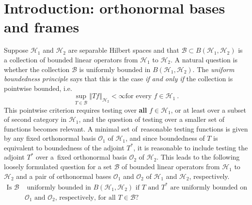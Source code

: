 \documentclass{amsart}%
\theoremstyle{plain}
\numberwithin{equation}{section}
\begin{document}
\section{Introduction: orthonormal bases and frames}

Suppose $\mathcal{H}_{1}$ and $\mathcal{H}_{2}$ are separable Hilbert spaces
and that $\mathcal{B}\subset B\left(  \mathcal{H}_{1},\mathcal{H}_{2}\right)
$ is a collection of bounded linear operators from $\mathcal{H}_{1}$ to
$\mathcal{H}_{2}$. A natural question is whether the
collection $\mathcal{B}$ is uniformly bounded in $B\left(  \mathcal{H}%
_{1},\mathcal{H}_{2}\right)  $. The \emph{uniform boundedness principle} says
that this is the case \emph{if and only if} the collection is pointwise
bounded, i.e.%
\[
\sup_{T\in\mathcal{B}}\left\Vert Tf\right\Vert _{\mathcal{H}_{2}}<\infty\text{
for every }f\in\mathcal{H}_{1}\ .
\]
This pointwise criterion requires testing over \textbf{all} $f\in
\mathcal{H}_{1}$, or at least over a subset of second category in
$\mathcal{H}_{1}$, and the question of testing over a smaller set of
functions becomes relevant. A minimal set of\ reasonable testing functions is
given by any fixed orthonormal basis $\mathcal{O}_{1}$ of $\mathcal{H}_{1}$,
and since boundedness of $T$ is equivalent to boundedness of the adjoint
$T^{\ast}$, it is reasonable to include testing the adjoint $T^{\ast}$ over
a\ fixed orthonormal basis $\mathcal{O}_{2}$ of $\mathcal{H}_{2}$. This leads
to the following loosely formulated question for a set $\mathcal{B}$ of
bounded linear operators from $\mathcal{H}_{1}$ to $\mathcal{H}_{2}$ and a
pair of orthonormal bases $\mathcal{O}_{1}$ and $\mathcal{O}_{2}$ of
$\mathcal{H}_{1}$ and $\mathcal{H}_{2}$, respectively.
\begin{align}
  \text{Is }\mathcal{B} &\text{ uniformly bounded in }B\left(
\mathcal{H}_{1},\mathcal{H}_{2}\right)  \text{ if }\label{question} T \text{ and } T^{\ast} \text{ are uniformly bounded on } \\&\mathcal{O}_{1}\text{ and } \mathcal{O}_{2}\text{, respectively, for all }T\in\mathcal{B}%
?\nonumber
\end{align}
\end{document}
